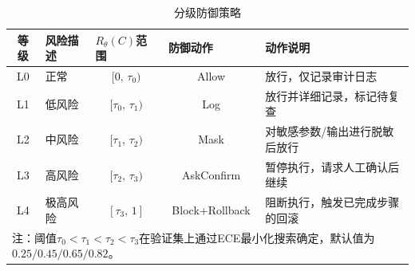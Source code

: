 \begin{table}[htbp]
\centering
\caption{分级防御策略}
\label{tab:risk_levels}
\small
\begin{tabular}{clccp{4.2cm}}
\toprule
\textbf{等级} & \textbf{风险描述} & \multicolumn{1}{l}{\textbf{$R_\theta(C)$范围}} & \multicolumn{1}{l}{\textbf{防御动作}} & \raggedright\arraybackslash\textbf{动作说明} \\
\midrule
L0 & 正常 & $[0,\,\tau_0)$ & Allow & 放行，仅记录审计日志 \\
L1 & 低风险 & $[\tau_0,\,\tau_1)$ & Log & 放行并详细记录，标记待复查 \\
L2 & 中风险 & $[\tau_1,\,\tau_2)$ & Mask & 对敏感参数/输出进行脱敏后放行 \\
L3 & 高风险 & $[\tau_2,\,\tau_3)$ & AskConfirm & 暂停执行，请求人工确认后继续 \\
L4 & 极高风险 & $[\tau_3,\,1]$ & Block+Rollback & 阻断执行，触发已完成步骤的回滚 \\
\bottomrule
\multicolumn{5}{l}{\footnotesize 注：阈值$\tau_0 < \tau_1 < \tau_2 < \tau_3$在验证集上通过ECE最小化搜索确定，默认值为$0.25/0.45/0.65/0.82$。} \\
\end{tabular}
\end{table}
